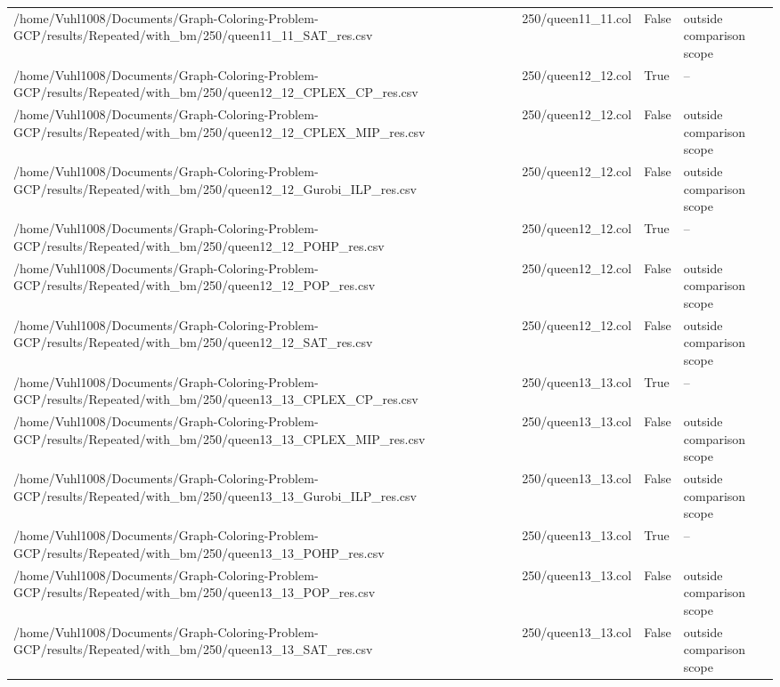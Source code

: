 \begin{table}[htbp]
\begin{tabular}{llll}
/home/Vuhl1008/Documents/Graph-Coloring-Problem-GCP/results/Repeated/with\_bm/250/queen11\_11\_SAT\_res.csv & 250/queen11\_11.col & False & outside comparison scope \\
/home/Vuhl1008/Documents/Graph-Coloring-Problem-GCP/results/Repeated/with\_bm/250/queen12\_12\_CPLEX\_CP\_res.csv & 250/queen12\_12.col & True & -- \\
/home/Vuhl1008/Documents/Graph-Coloring-Problem-GCP/results/Repeated/with\_bm/250/queen12\_12\_CPLEX\_MIP\_res.csv & 250/queen12\_12.col & False & outside comparison scope \\
/home/Vuhl1008/Documents/Graph-Coloring-Problem-GCP/results/Repeated/with\_bm/250/queen12\_12\_Gurobi\_ILP\_res.csv & 250/queen12\_12.col & False & outside comparison scope \\
/home/Vuhl1008/Documents/Graph-Coloring-Problem-GCP/results/Repeated/with\_bm/250/queen12\_12\_POHP\_res.csv & 250/queen12\_12.col & True & -- \\
/home/Vuhl1008/Documents/Graph-Coloring-Problem-GCP/results/Repeated/with\_bm/250/queen12\_12\_POP\_res.csv & 250/queen12\_12.col & False & outside comparison scope \\
/home/Vuhl1008/Documents/Graph-Coloring-Problem-GCP/results/Repeated/with\_bm/250/queen12\_12\_SAT\_res.csv & 250/queen12\_12.col & False & outside comparison scope \\
/home/Vuhl1008/Documents/Graph-Coloring-Problem-GCP/results/Repeated/with\_bm/250/queen13\_13\_CPLEX\_CP\_res.csv & 250/queen13\_13.col & True & -- \\
/home/Vuhl1008/Documents/Graph-Coloring-Problem-GCP/results/Repeated/with\_bm/250/queen13\_13\_CPLEX\_MIP\_res.csv & 250/queen13\_13.col & False & outside comparison scope \\
/home/Vuhl1008/Documents/Graph-Coloring-Problem-GCP/results/Repeated/with\_bm/250/queen13\_13\_Gurobi\_ILP\_res.csv & 250/queen13\_13.col & False & outside comparison scope \\
/home/Vuhl1008/Documents/Graph-Coloring-Problem-GCP/results/Repeated/with\_bm/250/queen13\_13\_POHP\_res.csv & 250/queen13\_13.col & True & -- \\
/home/Vuhl1008/Documents/Graph-Coloring-Problem-GCP/results/Repeated/with\_bm/250/queen13\_13\_POP\_res.csv & 250/queen13\_13.col & False & outside comparison scope \\
/home/Vuhl1008/Documents/Graph-Coloring-Problem-GCP/results/Repeated/with\_bm/250/queen13\_13\_SAT\_res.csv & 250/queen13\_13.col & False & outside comparison scope \\

\end{tabular}
\end{table}
